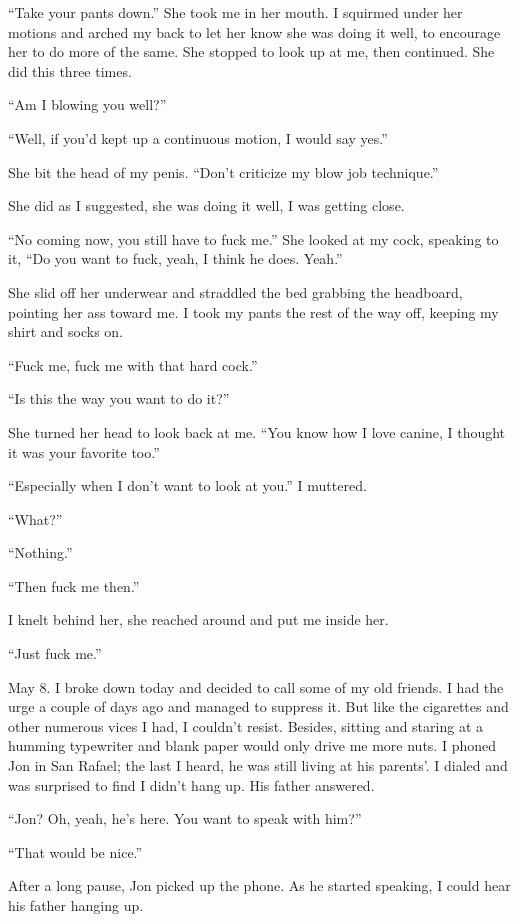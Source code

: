 ``Take your pants down.'' She took me in her mouth. I squirmed under her
motions and arched my back to let her know she was doing it well, to
encourage her to do more of the same. She stopped to look up at me, then
continued. She did this three times.

``Am I blowing you well?''

``Well, if you'd kept up a continuous motion, I would say yes.''

She bit the head of my penis. ``Don't criticize my blow job technique.''

She did as I suggested, she was doing it well, I was getting close.

``No coming now, you still have to fuck me.'' She looked at my cock,
speaking to it, ``Do you want to fuck, yeah, I think he does. Yeah.''

She slid off her underwear and straddled the bed grabbing the headboard,
pointing her ass toward me. I took my pants the rest of the way off,
keeping my shirt and socks on.

``Fuck me, fuck me with that hard cock.''

``Is this the way you want to do it?''

She turned her head to look back at me. ``You know how I love canine, I
thought it was your favorite too.''

``Especially when I don't want to look at you.'' I muttered.

``What?''

``Nothing.''

``Then fuck me then.''

I knelt behind her, she reached around and put me inside her.

``Just fuck me.''

May 8. I broke down today and decided to call some of my old friends. I
had the urge a couple of days ago and managed to suppress it. But like
the cigarettes and other numerous vices I had, I couldn't resist.
Besides, sitting and staring at a humming typewriter and blank paper
would only drive me more nuts. I phoned Jon in San Rafael; the last I
heard, he was still living at his parents'. I dialed and was surprised
to find I didn't hang up. His father answered.

``Jon? Oh, yeah, he's here. You want to speak with him?''

``That would be nice.''

After a long pause, Jon picked up the phone. As he started speaking, I
could hear his father hanging up.

